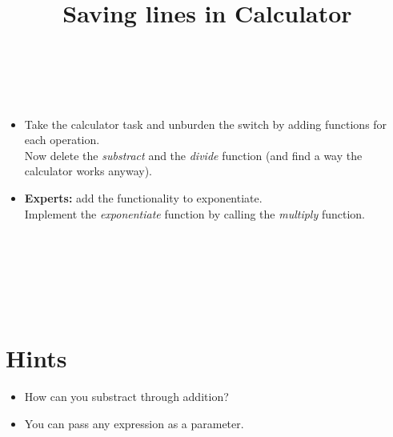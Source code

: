 


\title{Saving lines in Calculator} %
\author{} %
\renewcommand{\difficulty}{Easy} %
\renewcommand{\requirements}{Functions} %
\renewcommand{\aims}{Write clear code, abstract} %


 \maketitle
 \taskinfos

\ \\\ \\
\begin{itemize}
	\item Take the calculator task and unburden the switch by adding functions for each operation.\\
	Now delete the \textit{substract} and the \textit{divide} function (and find a way the calculator works anyway).
	\item \textbf{Experts:} add the functionality to exponentiate.\\
	Implement the \textit{exponentiate} function by calling the \textit{multiply} function.
\end{itemize}	
 
 
\ \\\ \\\ \\\ \\\ \\
\section*{Hints}
	\begin{itemize}
		\item How can you substract through addition?
		\item You can pass any expression as a parameter.
	\end{itemize}
 

